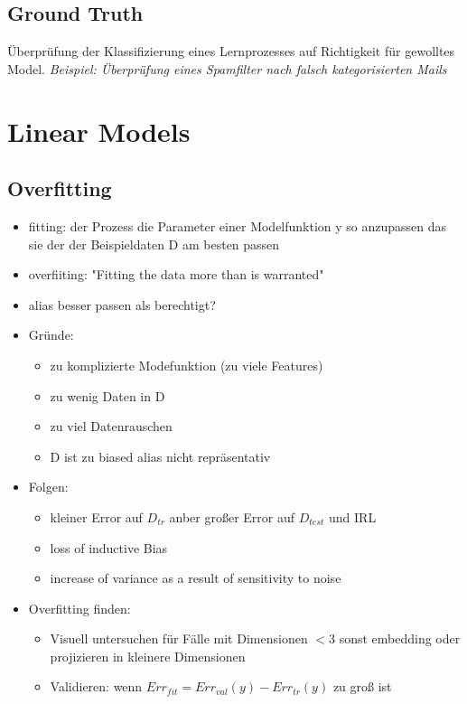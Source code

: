 \documentclass[11pt,a4paper]{article}
\begin{document}
\begin{flushleft}
\subsection{Ground Truth}
Überprüfung der Klassifizierung eines Lernprozesses auf Richtigkeit für gewolltes Model.\newline
\textit{Beispiel: Überprüfung eines Spamfilter nach falsch kategorisierten Mails}

\section{Linear Models}
\subsection{Overfitting}
\begin{itemize}
\item fitting: der Prozess die Parameter einer Modelfunktion y so anzupassen das sie der der Beispieldaten D am besten passen
\item overfiiting: "Fitting the data more than is warranted"
\item alias besser passen als berechtigt?
\item Gründe:
	\begin{itemize}
	\item zu komplizierte Modefunktion (zu viele Features) 
	\item zu wenig Daten in D
	\item zu viel Datenrauschen
	\item D ist zu biased alias nicht repräsentativ 
	\end{itemize}
\item Folgen:
	\begin{itemize}
	\item kleiner Error auf $D_{tr}$ anber großer Error auf $D_{test}$ und IRL
	\item loss of inductive Bias
	\item increase of variance as a result of sensitivity to noise
	\end{itemize}
\item Overfitting finden: 
	\begin{itemize}
	\item Visuell untersuchen für Fälle mit Dimensionen $<3$ sonst embedding oder 		projizieren  in kleinere Dimensionen
	\item Validieren: wenn $Err_{fit} = Err_{val}(y) - Err_{tr}(y)$ zu groß ist
	\end{itemize}

\end{itemize}
\end{flushleft}
\end{document}
